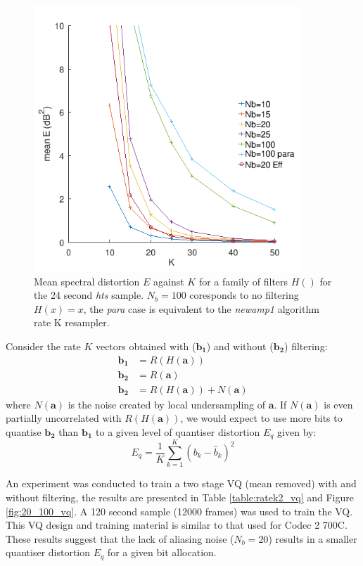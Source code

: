 \documentclass{article}
\begin{document}
\begin{figure}[h]
\caption{Mean spectral distortion $E$ against $K$ for a family of filters $H()$ for the 24 second \emph{hts} sample. $N_b=100$ coresponds to no filtering $H(x)=x$, the \emph{para} case is equivalent to the \emph{newamp1} algorithm rate K resampler.}
\label{fig:ratek2_E_K_hts}
\begin{center}
\includegraphics[width=10cm]{ratek2_E_K_hts.png}
\end{center}
\end{figure}

Consider the rate $K$ vectors obtained with ($\mathbf{b_1}$) and without ($\mathbf{b_2}$) filtering:
\begin{equation}
\begin{split}
\mathbf{b_1} &= R(H(\mathbf{a})) \\
\mathbf{b_2} &= R(\mathbf{a}) \\
\mathbf{b_2} &= R(H(\mathbf{a})) + N(\mathbf{a})
\end{split}
\end{equation}
where $N(\mathbf{a})$ is the noise created by local undersampling of $\mathbf{a}$.  If $N(\mathbf{a})$ is even partially uncorrelated with $R(H(\mathbf{a}))$, we would expect to use more bits to quantise $\mathbf{b_2}$ than $\mathbf{b_1}$ to a given level of quantiser distortion $E_q$ given by:
\begin{equation}
E_q =\frac{1}{K}\sum_{k=1}^{K}(b_k-\hat{b}_k)^2 
\end{equation}

An experiment was conducted to train a two stage VQ (mean removed) with and without filtering, the results are presented in Table \ref{table:ratek2_vq} and Figure \ref{fig:20_100_vq}.  A 120 second sample (12000 frames) was used to train the VQ. This VQ design and training material is similar to that used for Codec 2 700C.  These results suggest that the lack of aliasing noise ($N_b=20$) results in a smaller quantiser distortion $E_q$ for a given bit allocation.
\end{document}
